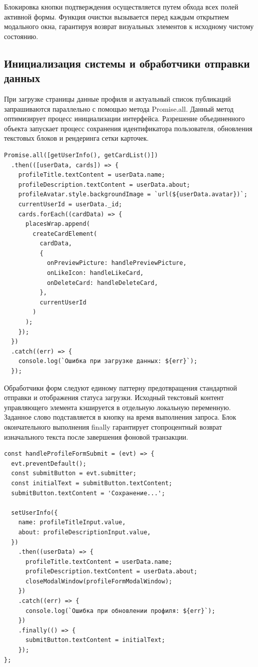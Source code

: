 \documentclass[bachelor, och, pract, times]{SCWorks}
\begin{document}
Блокировка кнопки подтверждения осуществляется путем обхода всех полей активной
формы. Функция очистки вызывается перед каждым открытием модального окна,
гарантируя возврат визуальных элементов к исходному чистому состоянию.

\subsection{Инициализация системы и обработчики отправки данных}
При загрузке страницы данные профиля и актуальный список публикаций
запрашиваются параллельно с помощью метода Promise.all. Данный метод
оптимизирует процесс инициализации интерфейса. Разрешение объединенного объекта
запускает процесс сохранения идентификатора пользователя, обновления текстовых
блоков и рендеринга сетки карточек.

\begin{verbatim}
Promise.all([getUserInfo(), getCardList()])
  .then(([userData, cards]) => {
    profileTitle.textContent = userData.name;
    profileDescription.textContent = userData.about;
    profileAvatar.style.backgroundImage = `url(${userData.avatar})`;
    currentUserId = userData._id;
    cards.forEach((cardData) => {
      placesWrap.append(
        createCardElement(
          cardData,
          {
            onPreviewPicture: handlePreviewPicture,
            onLikeIcon: handleLikeCard,
            onDeleteCard: handleDeleteCard,
          },
          currentUserId
        )
      );
    });
  })
  .catch((err) => {
    console.log(`Ошибка при загрузке данных: ${err}`);
  });
\end{verbatim}

Обработчики форм следуют единому паттерну предотвращения стандартной отправки и
отображения статуса загрузки. Исходный текстовый контент управляющего элемента
кэшируется в отдельную локальную переменную. Заданное слово подставляется в
кнопку на время выполнения запроса. Блок окончательного выполнения finally
гарантирует стопроцентный возврат изначального текста после завершения фоновой
транзакции.

\begin{verbatim}
const handleProfileFormSubmit = (evt) => {
  evt.preventDefault();
  const submitButton = evt.submitter;
  const initialText = submitButton.textContent;
  submitButton.textContent = 'Сохранение...';

  setUserInfo({
    name: profileTitleInput.value,
    about: profileDescriptionInput.value,
  })
    .then((userData) => {
      profileTitle.textContent = userData.name;
      profileDescription.textContent = userData.about;
      closeModalWindow(profileFormModalWindow);
    })
    .catch((err) => {
      console.log(`Ошибка при обновлении профиля: ${err}`);
    })
    .finally(() => {
      submitButton.textContent = initialText;
    });
};
\end{verbatim}
\end{document}

